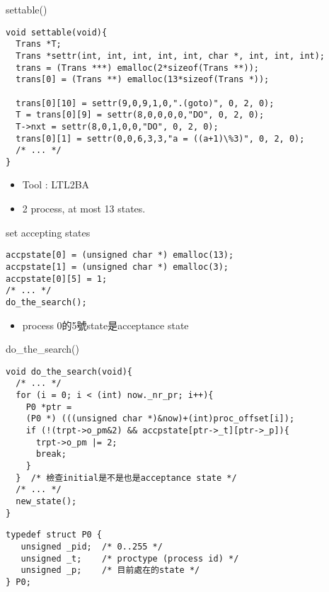\documentclass[12pt]{beamer}
\begin{document}
\begin{frame}[fragile]{settable()}
\begin{lstlisting}[basicstyle=\footnotesize\ttfamily]
void settable(void){ 
  Trans *T;
  Trans *settr(int, int, int, int, int, char *, int, int, int);
  trans = (Trans ***) emalloc(2*sizeof(Trans **));
  trans[0] = (Trans **) emalloc(13*sizeof(Trans *));

  trans[0][10] = settr(9,0,9,1,0,".(goto)", 0, 2, 0);
  T = trans[0][9] = settr(8,0,0,0,0,"DO", 0, 2, 0);
  T->nxt = settr(8,0,1,0,0,"DO", 0, 2, 0);
  trans[0][1] = settr(0,0,6,3,3,"a = ((a+1)\%3)", 0, 2, 0);
  /* ... */
}
\end{lstlisting}
\begin{itemize}
	\item Tool : LTL2BA
	\item 2 process, at most 13 states.
\end{itemize}
\end{frame}

\begin{frame}[fragile]{set accepting states}
\begin{lstlisting}[basicstyle=\normalsize\ttfamily]
accpstate[0] = (unsigned char *) emalloc(13);
accpstate[1] = (unsigned char *) emalloc(3);
accpstate[0][5] = 1;
/* ... */
do_the_search();
\end{lstlisting}
\begin{itemize}
	\item process 0的5號state是acceptance state
\end{itemize}
\end{frame}

\begin{frame}[fragile]{do\_the\_search()}
\begin{lstlisting}[basicstyle=\footnotesize\ttfamily]
void do_the_search(void){
  /* ... */
  for (i = 0; i < (int) now._nr_pr; i++){
    P0 *ptr = 
    (P0 *) (((unsigned char *)&now)+(int)proc_offset[i]);
    if (!(trpt->o_pm&2) && accpstate[ptr->_t][ptr->_p]){
      trpt->o_pm |= 2;
      break;
    }
  }  /* 檢查initial是不是也是acceptance state */
  /* ... */
  new_state();
}
\end{lstlisting}
\begin{lstlisting}[basicstyle=\footnotesize\ttfamily]
typedef struct P0 {
   unsigned _pid;  /* 0..255 */
   unsigned _t;    /* proctype (process id) */
   unsigned _p;    /* 目前處在的state */
} P0;
\end{lstlisting}
\end{frame}
\end{document}
